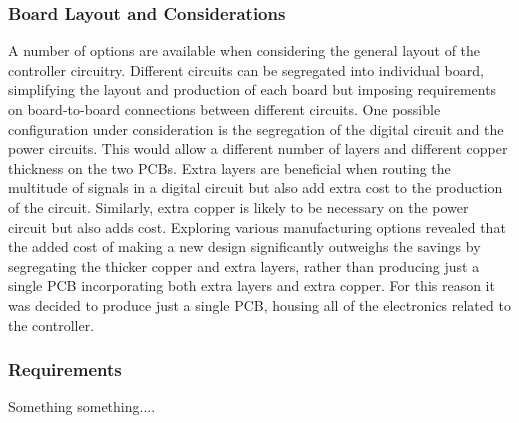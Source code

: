 \subsubsection{Board Layout and Considerations} %
\label{ssub:board_layout_and_considerations}
A number of options are available when considering the general layout of the controller circuitry.
Different circuits can be segregated into individual board, simplifying the layout and production of each board but imposing requirements on board-to-board connections between different circuits.
One possible configuration under consideration is the segregation of the digital circuit and the power circuits.
This would allow a different number of layers and different copper thickness on the two PCBs.
Extra layers are beneficial when routing the multitude of signals in a digital circuit but also add extra cost to the production of the circuit.
Similarly, extra copper is likely to be necessary on the power circuit but also adds cost.
Exploring various manufacturing options revealed that the added cost of making a new design significantly outweighs the savings by segregating the thicker copper and extra layers, rather than producing just a single PCB incorporating both extra layers and extra copper.
For this reason it was decided to produce just a single PCB, housing all of the electronics related to the controller.

\subsubsection{Requirements}
Something something....
